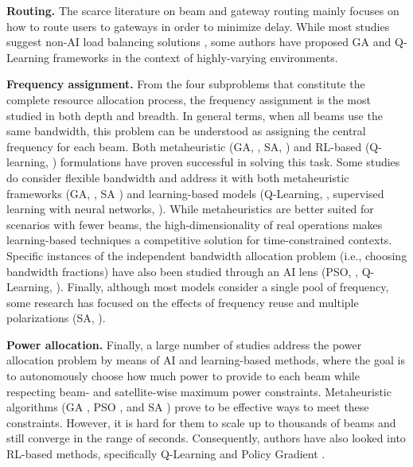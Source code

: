 \documentclass[letterpaper]{article} %
\begin{document}
\textbf{Routing.} The scarce literature on beam and gateway routing mainly focuses on how to route users to gateways in order to minimize delay. While most studies suggest non-AI load balancing solutions \cite{torkzaban2020joint, yang2016towards}, some authors have proposed GA \cite{rao2011performance} and Q-Learning \cite{gong2020adaptive} frameworks in the context of highly-varying environments.

\textbf{Frequency assignment.} From the four subproblems that constitute the complete resource allocation process, the frequency assignment is the most studied in both depth and breadth. In general terms, when all beams use the same bandwidth, this problem can be understood as assigning the central frequency for each beam. Both metaheuristic (GA, \cite{He2017, tirmizi2015efficient}, SA, \cite{vidal2020joint}) and RL-based (Q-learning, \cite{Hu2018ASystems}) formulations have proven successful in solving this task. Some studies do consider flexible bandwidth and address it with both metaheuristic frameworks (GA, \cite{Angeletti2006, Paris2019}, SA \cite{Cocco2018}) and learning-based models (Q-Learning, \cite{liao2020distributed, zheng2020leo}, supervised learning with neural networks, \cite{Funabiki1997, Salcedo-Sanz2005}). While metaheuristics are better suited for scenarios with fewer beams, the high-dimensionality of real operations makes learning-based techniques a competitive solution for time-constrained contexts. Specific instances of the independent bandwidth allocation problem (i.e., choosing bandwidth fractions) have also been studied through an AI lens (PSO, \cite{pachler20b}, Q-Learning, \cite{Ferreira2018}). Finally, although most models consider a single pool of frequency, some research has focused on the effects of frequency reuse and multiple polarizations (SA, \cite{Camino2014}).

\textbf{Power allocation.} Finally, a large number of studies address the power allocation problem by means of AI and learning-based methods, where the goal is to autonomously choose how much power to provide to each beam while respecting beam- and satellite-wise maximum power constraints. Metaheuristic algorithms (GA \cite{Aravanis2015, Anzalchi2010, Paris2019}, PSO \cite{Durand2017, pachler20b}, and SA \cite{vidal2020joint, Cocco2018}) prove to be effective ways to meet these constraints. However, it is hard for them to scale up to thousands of beams and still converge in the range of seconds. Consequently, authors have also looked into RL-based methods, specifically Q-Learning \cite{zhang2020online, liao2020distributed, Ferreira2018} and Policy Gradient \cite{Luis2019, Luis2020}.
\end{document}
